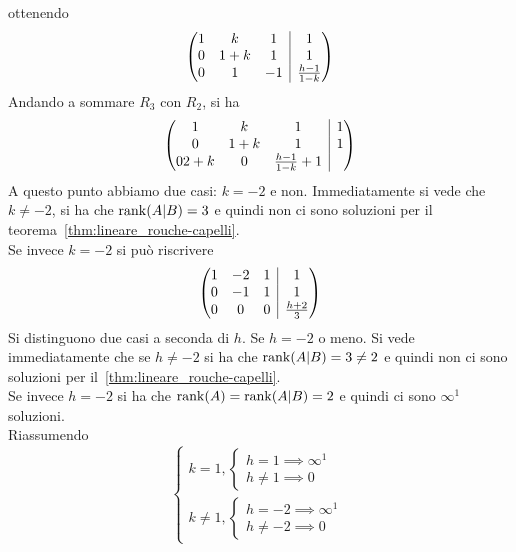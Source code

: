 ottenendo
\begin{equation*}
  \left(
    \begin{array}{@{}ccc|c@{}}
    1 & k & 1 & 1\\
    0 & 1+k & 1 & 1\\
    0 & 1 & -1 & \frac{h-1}{1-k}
    \end{array}
  \right)
\end{equation*}
Andando a sommare $R_3$ con $R_2$, si ha
\begin{equation*}
  \left(
    \begin{array}{@{}ccc|c@{}}
    1 & k & 1 & 1\\
    0 & 1+k & 1 & 1\\
    0 2+k & 0 & \frac{h-1}{1-k}+1
    \end{array}
  \right)
\end{equation*}
A questo punto abbiamo due casi: $k=-2$ e non. Immediatamente si vede che $k\neq-2$, si
ha che $\rank(A\vert B) = 3$ e quindi non ci sono soluzioni per il
teorema~\autoref{thm:lineare_rouche-capelli}.\\
Se invece $k=-2$ si può riscrivere
\begin{equation*}
  \left(
    \begin{array}{@{}ccc|c@{}}
      1 & -2 & 1 & 1\\
      0 & -1 & 1 & 1\\
      0 & 0 & 0 & \frac{h+2}{3}
    \end{array}
  \right)
\end{equation*}
Si distinguono due casi a seconda di $h$. Se $h=-2$ o meno. Si vede immediatamente che
se $h\neq-2$ si ha che $\rank(A\vert B)=3\neq2$ e quindi non ci sono soluzioni per
il~\autoref{thm:lineare_rouche-capelli}.\\
Se invece $h=-2$ si ha che $\rank(A) = \rank(A\vert B) = 2$ e quindi ci sono $\infty^1$
soluzioni.\\
Riassumendo
\begin{equation*}
  \begin{cases}
    k=1,
    \begin{cases}
      h=1\implies\infty^1\\
      h\neq 1\implies 0
    \end{cases}\\
    k\neq1,
    \begin{cases}
      h=-2\implies\infty^1\\
      h\neq-2\implies 0
    \end{cases}
  \end{cases}
\end{equation*}
